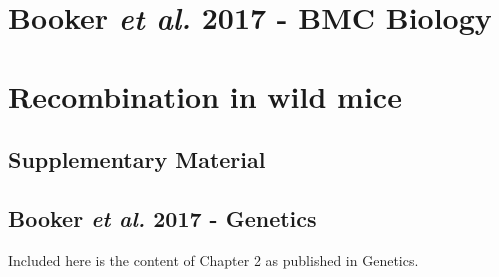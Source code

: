 \documentclass[openright,oneside,a4paper,english,12pt]{book}
\makeatletter
\newcommand{\dir}{/Users/s0784966/Dropbox/Thesis}
\renewcommand{\frontmatter}{\cleardoublepage\@mainmatterfalse}
\renewcommand{\mainmatter}{\cleardoublpage\@mainmattertrue}
\makeatother
\begin{document}





 





\tableofcontents

\listoffigures
\listoftables
\renewcommand{\contentsname}{Table of Contents}












\begin{appendices}
  \chapter{Booker \emph{et al.} 2017 - BMC Biology}
	  

  \chapter{Recombination in wild mice}
	  \section{Supplementary Material}
	  
	  \section{Booker \emph{et al.} 2017 - Genetics}
	  Included here is the content of Chapter 2 as published in Genetics.
	  
\end{appendices}
\end{document}
